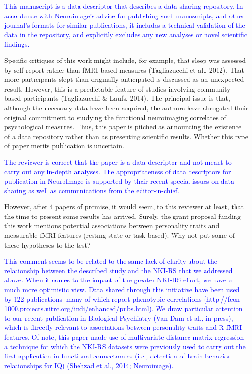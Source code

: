 \documentclass{article}
\newcommand{\RESPONSE}[1]{\textcolor{blue}{#1}}
\begin{document}
\RESPONSE{This manuscript is a data descriptor that describes a data-sharing repository. In accordance with Neuroimage's advice for publishing such manuscripts, and other journal's formats for similar publications, it includes a technical validation of the data in the repository, and explicitly excludes any new analyses or novel scientific findings.}

Specific critiques of this work might include, for example, that sleep was assessed by self-report rather than fMRI-based measures (Tagliazucchi et al., 2012). That more participants slept than originally anticipated is discussed as an unexpected result. However, this is a predictable feature of studies involving community-based participants (Tagliazucchi \& Laufs, 2014). The principal issue is that, although the necessary data have been acquired, the authors have abrogated their original commitment to studying the functional neuroimaging correlates of psychological measures. Thus, this paper is pitched as announcing the existence of a data repository rather than as presenting scientific results. Whether this type of paper merits publication is uncertain.

\RESPONSE{The reviewer is correct that the paper is a data descriptor and not meant to carry out any in-depth analyses. The appropriateness of data descriptors for publication in NeuroImage is supported by their recent special issues on data sharing as well as communications from the editor-in-chief.}

However, after 4 papers of promise, it would seem, to this reviewer at least, that the time to present some results has arrived. Surely, the grant proposal funding this work mentions potential associations between
personality traits and measurable fMRI features (resting state or task-based). Why not put some of these hypotheses to the test? 

\RESPONSE{This comment seems to be related to the same lack of clarity about the relationship between the described study and the NKI-RS that we addressed above. When it comes to the impact of the greater NKI-RS effort, we have a much more optimistic view. Data shared through this initiative have been used by 122 publications, many of which report phenotypic correlations (http://fcon 1000.projects.nitrc.org/indi/enhanced/pubs.html). We draw particular attention to our recent publication in Biological Psychiatry (Van Dam et al., in press), which is directly relevant to associations between personality traits and R-fMRI features. Of note, this paper made use of multivariate distance matrix regression - a technique for which the NKI-RS datasets were previously used to carry out the first application in functional connectomics (i.e., detection of brain-behavior relationships for IQ) (Shehzad et al., 2014; Neuroimage).}
\end{document}
